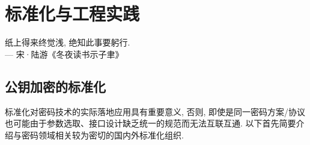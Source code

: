 \section{标准化与工程实践}
\begin{center}
	纸上得来终觉浅, 绝知此事要躬行. \\
                \hfill --- 宋·陆游《冬夜读书示子聿》
\end{center}


\subsection{公钥加密的标准化}
标准化对密码技术的实际落地应用具有重要意义, 否则, 即使是同一密码方案/协议也可能由于参数选取、接口设计缺乏统一的规范而无法互联互通. 
以下首先简要介绍与密码领域相关较为密切的国内外标准化组织. 


